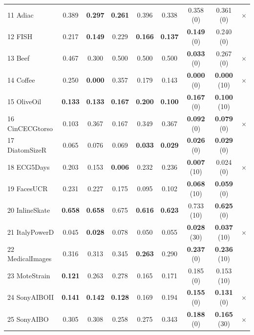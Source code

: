 \begin{table}[h!]
{\begin{tabular}{|l|ccccc|ccc|}
			11 Adiac               & 0.389 & \textbf{0.297} & \textbf{0.261} & 0.396 & 0.338     & 0.358 (0)  & 0.361 (0) & $\times$\\
			12 FISH                & 0.217 & \textbf{0.149} & 0.229 & \textbf{0.166} & \textbf{0.137}   & \textbf{0.149} (0)  & 0.240 (0) & \checkmark  \\
			13 Beef                & 0.467 & 0.300 & 0.500 & 0.500 & 0.500     & \textbf{0.033} (0) & 0.267 (0) & $\times$   \\
			14 Coffee              & 0.250 & \textbf{0.000}    & 0.357 & 0.179 & 0.143     & \textbf{0.000} (0)     & \textbf{0.000} (10) &$\times$  \\
			15 OliveOil            & \textbf{0.133} & \textbf{0.133} & \textbf{0.167} & \textbf{0.200} & \textbf{0.100}    & \textbf{0.167} (0)  & \textbf{0.100} (10) & \checkmark \\
			16 CinCECGtorso        & 0.103 & 0.367 & 0.167 & 0.349 & 0.367  & \textbf{0.092} (0)  & \textbf{0.079} (0) & $\times$   \\
			17 DiatomSizeR     	& 0.065 & 0.076 & 0.069 & \textbf{0.033} & \textbf{0.029}     & \textbf{0.026} (0)  & \textbf{0.029} (0) & \checkmark \\
			18 ECG5Days            & 0.203 & 0.153 & \textbf{0.006} & 0.232 & 0.236    & \textbf{0.007} (10) & 0.024 (0)  & $\times$   \\
			19 FacesUCR            & 0.231 & 0.227 & 0.175 & 0.095 & 0.102     & \textbf{0.068}  (10) & \textbf{0.059} (0) & \checkmark \\
			20 InlineSkate         & \textbf{0.658} & \textbf{0.658} & 0.675 & \textbf{0.616} & \textbf{0.623}     & 0.733  (10) & \textbf{0.625} (0) & \checkmark \\
			21 ItalyPowerD     	& 0.045 & \textbf{0.028}& 0.078 & 0.050 & 0.055    & \textbf{0.028} (30) & \textbf{0.037} (10) & $\times$  \\
			22 MedicalImages       & 0.316 & 0.313 & 0.345 & \textbf{0.263} & 0.290     & \textbf{0.237} (0) & \textbf{0.236} (10) & \checkmark \\
			23 MoteStrain          & \textbf{0.121} & 0.263& 0.278 & 0.165& 0.171     & 0.185 (0)  & 0.153 (10) & \checkmark \\
			24 SonyAIBOII          & \textbf{0.141} & \textbf{0.142} & \textbf{0.128} & 0.169 & 0.194     & \textbf{0.155} (0)  & \textbf{0.131} (0) & $\times$  \\
			25 SonyAIBO            & 0.305 & 0.308 & 0.258 & 0.275 & 0.343     & \textbf{0.188} (0)  & \textbf{0.165} (30) & $\times$   \\

\end{tabular}}
\end{table}
